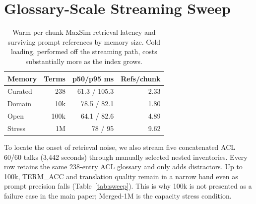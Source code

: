 \section{Glossary-Scale Streaming Sweep}
\label{app:sweep}

\begin{table}[ht]
\centering
\scriptsize
\begin{tabular}{lrrr}
\toprule
Memory & Terms & p50/p95 ms & Refs/chunk \\
\midrule
Curated & 238 & 61.3 / 105.3 & 2.33 \\
Domain & 10k & 78.5 / 82.1 & 1.80 \\
Open & 100k & 64.1 / 82.6 & 4.89 \\
Stress & 1M & 78 / 95 & 9.62 \\
\bottomrule
\end{tabular}
\caption{Warm per-chunk MaxSim retrieval latency and surviving prompt
references by memory size. Cold loading, performed off the streaming path,
costs substantially more as the index grows.}
\label{tab:scale}
\end{table}

To locate the onset of retrieval noise, we also stream five concatenated ACL
60/60 talks (3,442 seconds) through manually selected nested inventories. Every
row retains the same 238-entry ACL glossary and only adds distractors. Up to
100k, TERM\_ACC and translation quality remain in a narrow band even as prompt
precision falls (Table~\ref{tab:sweep}). This is why 100k is not presented as a
failure case in the main paper; Merged-1M is the capacity stress condition.

\begin{table}[ht]
\centering
\scriptsize
{}
\caption{Controlled ACL capacity sweep. Gold@10 is gold-term coverage within
the prompt cap; Prec@10 is retrieval precision; M-BLEU masks technical terms.}
\label{tab:sweep}
\end{table}

